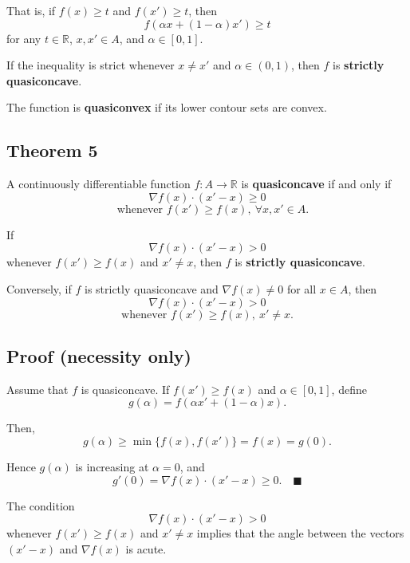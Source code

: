 That is, if $f(x) \ge t$ and $f(x') \ge t$, then
\[
f(\alpha x + (1-\alpha)x') \ge t
\]
for any $t \in \mathbb{R}$, $x,x' \in A$, and $\alpha \in [0,1]$.

If the inequality is strict whenever $x \neq x'$ and $\alpha \in (0,1)$,
then $f$ is \textbf{strictly quasiconcave}.

The function is \textbf{quasiconvex} if its lower contour sets are convex.


\begin{tcolorbox}[breakable, colback=white]
\subsection*{Theorem 5}

A continuously differentiable function $f : A \to \mathbb{R}$ is
\textbf{quasiconcave} if and only if
\[
\nabla f(x)\cdot (x' - x) \ge 0
\]
\[
\quad \text{whenever } f(x') \ge f(x), \ \forall x,x' \in A.
\]

If
\[
\nabla f(x)\cdot (x' - x) > 0
\]
whenever $f(x') \ge f(x)$ and $x' \ne x$, then $f$ is
\textbf{strictly quasiconcave}.

Conversely, if $f$ is strictly quasiconcave and $\nabla f(x) \ne 0$
for all $x \in A$, then
\[
\nabla f(x)\cdot (x' - x) > 0
\]
\[
\text{whenever } f(x') \ge f(x), \ x' \ne x.
\]

\subsection*{Proof (necessity only)}

Assume that $f$ is quasiconcave. If $f(x') \ge f(x)$ and $\alpha \in [0,1]$, define
\[
g(\alpha) = f(\alpha x' + (1-\alpha)x).
\]

Then,
\[
g(\alpha) \ge \min\{f(x), f(x')\} = f(x) = g(0).
\]

Hence $g(\alpha)$ is increasing at $\alpha=0$, and
\[
g'(0) = \nabla f(x)\cdot (x' - x) \ge 0. \quad \blacksquare
\]



\end{tcolorbox}

\vspace{1em}

The condition
\[
\nabla f(x)\cdot (x' - x) > 0
\]
whenever $f(x') \ge f(x)$ and $x' \ne x$
implies that the angle between the vectors $(x'-x)$ and $\nabla f(x)$ is acute.

\vspace{1em}

